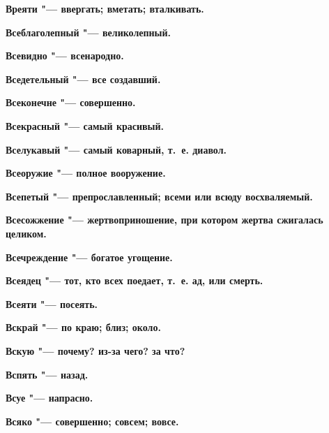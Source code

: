 \begin{mymulticols}{2}
\bfseries Вреяти\normalfont{} "--- ввергать; вметать; вталкивать. 




\bfseries Всеблаголепный\normalfont{} "--- великолепный. 




\bfseries Всевидно\normalfont{} "--- всенародно. 




\bfseries Вседетельный\normalfont{} "--- все создавший. 




\bfseries Всеконечне\normalfont{} "--- совершенно. 




\bfseries Всекрасный\normalfont{} "--- самый красивый. 




\bfseries Вселукавый\normalfont{} "--- самый коварный, т.~е. диавол. 




\bfseries Всеоружие\normalfont{} "--- полное вооружение. 




\bfseries Всепетый\normalfont{} "--- препрославленный; всеми или всюду восхваляемый. 




\bfseries Всесожжение\normalfont{} "--- жертвоприношение, при котором жертва сжигалась целиком. 




\bfseries Всечреждение\normalfont{} "--- богатое угощение. 




\bfseries Всеядец\normalfont{} "--- тот, кто всех поедает, т.~е. ад, или смерть. 




\bfseries Всеяти\normalfont{} "--- посеять. 




\bfseries Вскрай\normalfont{} "--- по краю; близ; около. 




\bfseries Вскую\normalfont{} "--- почему? из-за чего? за что? 




\bfseries Вспять\normalfont{} "--- назад. 




\bfseries Всуе\normalfont{} "--- напрасно. 




\bfseries Всяко\normalfont{} "--- совершенно; совсем; вовсе. 





\end{mymulticols}
